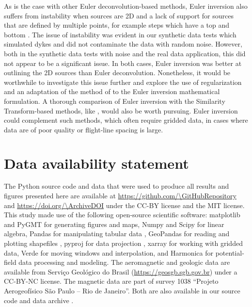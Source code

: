 As is the case with other Euler deconvolution-based methods, Euler inversion
also suffers from instability when sources are 2D \citep{Mushayandebvu2004}
and a lack of support for sources that are defined by multiple points, for
example steps which have a top and bottom \citep{Gerovska2010}.
The issue of instability was evident in our synthetic data tests which
simulated dykes and did not contaminate the data with random noise.
However, both in the synthetic data tests with noise and the real data
application, this did not appear to be a significant issue.
In both cases, Euler inversion was better at outlining the 2D sources than
Euler deconvolution.
Nonetheless, it would be worthwhile to investigate this issue further and
explore the use of regularization and an adaptation of the method of
\citet{Mushayandebvu2004} to the Euler inversion mathematical formulation.
A thorough comparison of Euler inversion with the Similarity Transform-based
methods, like \citet{Gerovska2010}, would also be worth pursuing.
Euler inversion could complement such methods, which often require gridded
data, in cases where data are of poor quality or flight-line spacing is large.


\section*{Data availability statement}

The Python source code and data that were used to produce all results and
figures presented here are available at
\url{https://github.com/\GitHubRepository}
and \url{https://doi.org/\ArchiveDOI} \citep{figshare}
under the CC-BY license and the MIT license.
This study made use of the following open-source scientific software:
matplotlib \citep{Hunter2007} and PyGMT \citep{pygmt} for generating figures
and maps,
Numpy \citep{numpy} and Scipy \citep{scipy} for linear algebra,
Pandas for manipulating tabular data \citep{McKinney2010,pandas},
GeoPandas for reading and plotting shapefiles \citep{geopandas},
pyproj for data projection \citep{pyproj},
xarray \citep{xarray} for working with gridded data,
Verde \citep{verde2018} for moving windows and interpolation,
and Harmonica \citep{harmonica} for potential-field data processing and
modeling.
The aeromagnetic and geologic data are available from Serviço Geológico do
Brasil (\url{https://geosgb.sgb.gov.br}) under a CC-BY-NC license.
The magnetic data are part of survey 1038 ``Projeto Aerogeofísico São Paulo --
Rio de Janeiro''.
Both are also available in our source code and data archive \citep{figshare}.


